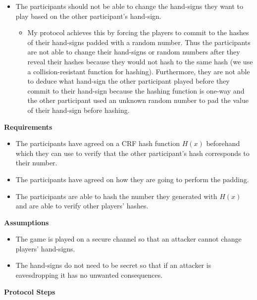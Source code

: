 \documentclass{article}
\begin{document}
\begin{itemize}
\itemsep1pt\parskip0pt
\item
  The participants should not be able to change the hand-signs they want
  to play based on the other participant's hand-sign.

  \begin{itemize}
  \itemsep1pt\parskip0pt
  \item
    My protocol achieves this by forcing the players to commit to the
    hashes of their hand-signs padded with a random number. Thus the
    participants are not able to change their hand-signs or random
    numbers after they reveal their hashes because they would not hash
    to the same hash (we use a collision-resistant function for
    hashing). Furthermore, they are not able to deduce what hand-sign
    the other participant played before they commit to their hand-sign
    because the hashing function is one-way and the other participant
    used an unknown random number to pad the value of their hand-sign
    before hashing.
  \end{itemize}
\end{itemize}

\textbf{Requirements}

\begin{itemize}
\itemsep1pt\parskip0pt
\item
  The participants have agreed on a CRF hash function $H(x)$ beforehand
  which they can use to verify that the other participant's hash
  corresponds to their number.
\item
  The participants have agreed on how they are going to perform the
  padding.
\item
  The participants are able to hash the number they generated with
  $H(x)$ and are able to verify other players' hashes.
\end{itemize}

\textbf{Assumptions}

\begin{itemize}
\itemsep1pt\parskip0pt
\item
  The game is played on a secure channel so that an attacker cannot
  change players' hand-signs.
\item
  The hand-signs do not need to be secret so that if an attacker is
  eavesdropping it has no unwanted consequences.
\end{itemize}

\textbf{Protocol Steps}
\end{document}
